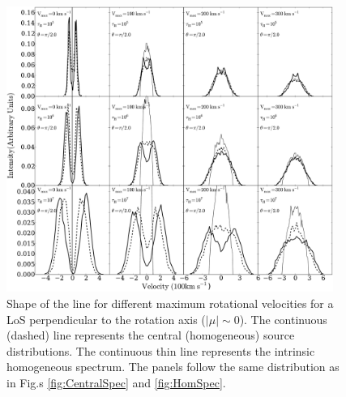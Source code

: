 \begin{figure}
\begin{center}
\includegraphics[width=0.95\textwidth]{Figures/f4.pdf}
\end{center}
\caption{Shape of the \ly line for different maximum rotational
velocities for a LoS perpendicular to the rotation axis
($|\mu|\sim 0$). The continuous (dashed) line represents the central
(homogeneous) source distributions. The continuous thin line
represents the intrinsic homogeneous spectrum. The panels follow the same
distribution as in Fig.s \ref{fig:CentralSpec} and \ref{fig:HomSpec}.
\label{fig:differentvelocities}}
\end{figure}

